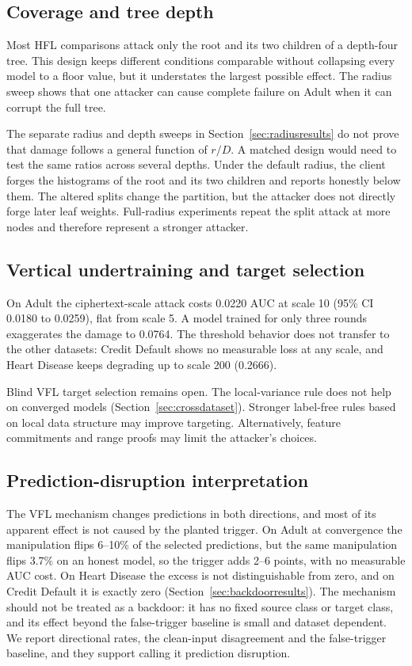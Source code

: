 \documentclass[11pt]{article}
\newcommand{\rev}[1]{{\color{blue}#1}}
\begin{document}
\subsection{Coverage and tree depth}

Most HFL comparisons attack \rev{only the root and its two children} of a depth-four tree. This design keeps different conditions comparable without collapsing every model to a floor value, but it understates the largest possible effect. The radius sweep shows that one attacker can cause complete failure on Adult when it can corrupt the full tree.

The separate radius and depth sweeps in Section~\ref{sec:radiusresults} do not prove that damage follows a general function of $r/D$. A matched design would need to test the same ratios across several depths. \rev{Under the default radius, the client forges the histograms of the root and its two children and reports honestly below them.} The altered \rev{splits change} the partition, but the attacker does not directly forge later leaf weights. Full-radius experiments repeat the split attack at more nodes and therefore represent a stronger attacker.

\subsection{Vertical undertraining and target selection}

\rev{On Adult the ciphertext-scale attack costs 0.0220 AUC at scale 10 (95\% CI 0.0180 to 0.0259), flat from scale 5. A model trained for only three rounds exaggerates the damage to 0.0764. The threshold behavior does not transfer to the other datasets: Credit Default shows no measurable loss at any scale, and Heart Disease keeps degrading up to scale 200 (0.2666).}

\rev{Blind VFL target selection remains open. The local-variance rule does not help on converged models (Section~\ref{sec:crossdataset}). Stronger label-free rules based on local data structure may improve targeting. Alternatively, feature commitments and range proofs may limit the attacker's choices.}

\subsection{\rev{Prediction-disruption interpretation}}

\rev{The VFL mechanism changes predictions in both directions, and most of its apparent effect is not caused by the planted trigger. On Adult at convergence the manipulation flips 6--10\% of the selected predictions, but the same manipulation flips 3.7\% on an honest model, so the trigger adds 2--6 points, with no measurable AUC cost. On Heart Disease the excess is not distinguishable from zero, and on Credit Default it is exactly zero (Section~\ref{sec:backdoorresults}). The mechanism should not be treated as a backdoor: it has no fixed source class or target class, and its effect beyond the false-trigger baseline is small and dataset dependent. We report directional rates, the clean-input disagreement and the false-trigger baseline, and they support calling it prediction disruption.}
\end{document}
